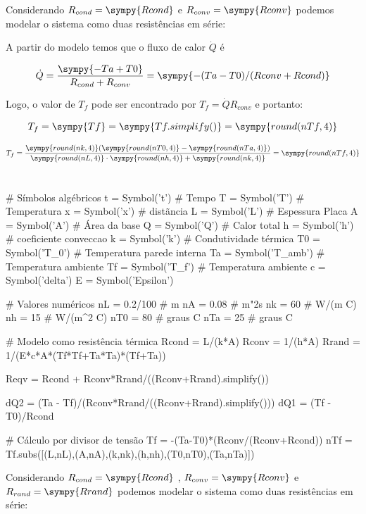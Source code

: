 \documentclass[a4paper,11pt]{article}
\newcommand{\npy}[1]{\sympy{round(n#1,4)}}
\begin{document}
Considerando $R_{cond} = \sympy{Rcond}$ e $R_{conv} = \sympy{Rconv}$ podemos modelar o sistema como duas resistências em série:


A partir do modelo temos que o fluxo de calor $\dot{Q}$ é

$$\dot{Q} = \frac{\sympy{-Ta+T0}}{R_{cond} + R_{conv}}  = \sympy{-(Ta-T0)/(Rconv+Rcond)}$$

Logo, o valor de $T_f$ pode ser encontrado por $T_f = \dot{Q} R_{conv}$ e portanto:

$$T_f = \sympy{Tf} = \sympy{Tf.simplify()} = \npy{Tf}$$

$$T_f = \frac{\npy{k}(\npy{T0} - \npy{Ta})}{\npy{L}\cdot \npy{h} + \npy{k}}= \npy{Tf}$$

\section{}

\begin{sympycode}
# Símbolos algébricos
t = Symbol('t') # Tempo
T = Symbol('T') # Temperatura
x = Symbol('x') # distãncia
L = Symbol('L') # Espessura Placa
A = Symbol('A') # Área da base
Q = Symbol('Q') # Calor total
h = Symbol('h') # coeficiente conveccao
k = Symbol('k') # Condutividade térmica
T0 = Symbol('T_0') # Temperatura parede interna
Ta = Symbol('T_amb') # Temperatura ambiente
Tf = Symbol('T_f') # Temperatura ambiente
c = Symbol('delta')
E = Symbol('Epsilon')

# Valores numéricos
nL = 0.2/100 # m
nA = 0.08 # m"2s
nk = 60 # W/(m C)
nh = 15 # W/(m^2 C)
nT0 = 80 # graus C
nTa = 25 # graus C

# Modelo como resistência térmica
Rcond = L/(k*A)
Rconv = 1/(h*A)
Rrand = 1/(E*c*A*(Tf*Tf+Ta*Ta)*(Tf+Ta))

Reqv =  Rcond + Rconv*Rrand/((Rconv+Rrand).simplify())

dQ2 = (Ta - Tf)/(Rconv*Rrand/((Rconv+Rrand).simplify()))
dQ1 = (Tf - T0)/Rcond

# Cálculo por divisor de tensão
Tf = -(Ta-T0)*(Rconv/(Rconv+Rcond))
nTf = Tf.subs([(L,nL),(A,nA),(k,nk),(h,nh),(T0,nT0),(Ta,nTa)])
\end{sympycode}

Considerando $R_{cond} = \sympy{Rcond}$ , $R_{conv} = \sympy{Rconv}$ e $R_{rand} = \sympy{Rrand}$ podemos modelar o sistema como duas resistências em série:
\end{document}

